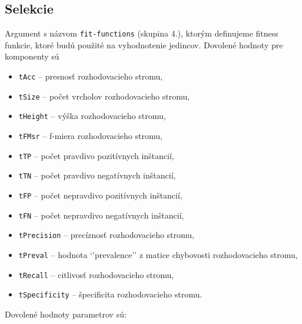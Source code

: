 \subsection*{Selekcie}
Argument s názvom \verb|fit-functions| (skupina 4.), ktorým definujeme fitness funkcie, ktoré budú použité na vyhodnotenie jedincov.
Dovolené hodnoty pre komponenty sú 
\begin{itemize}
\item \verb|tAcc| -- presnosť rozhodovacieho stromu,
\item \verb|tSize|  -- počet vrcholov rozhodovacieho stromu,
\item \verb|tHeight| -- výška rozhodovacieho stromu,
\item \verb|tFMsr| -- f-miera rozhodovacieho stromu,
\item \verb|tTP| -- počet pravdivo pozitívnych inštancií,
\item \verb|tTN| -- počet pravdivo negatívnych inštancií,
\item \verb|tFP| -- počet nepravdivo pozitívnych inštancií,
\item \verb|tFN| -- počet nepravdivo negatívnych inštancií,
\item \verb|tPrecision| -- precíznosť rozhodovacieho stromu,
\item \verb|tPreval| -- hodnota `'prevalence'' z matice chybovosti rozhodovacieho stromu,
\item \verb|tRecall| -- citlivosť rozhodovacieho stromu,
\item \verb|tSpecificity| -- špecificita rozhodovacieho stromu.
\end{itemize}

Dovolené hodnoty parametrov sú:

